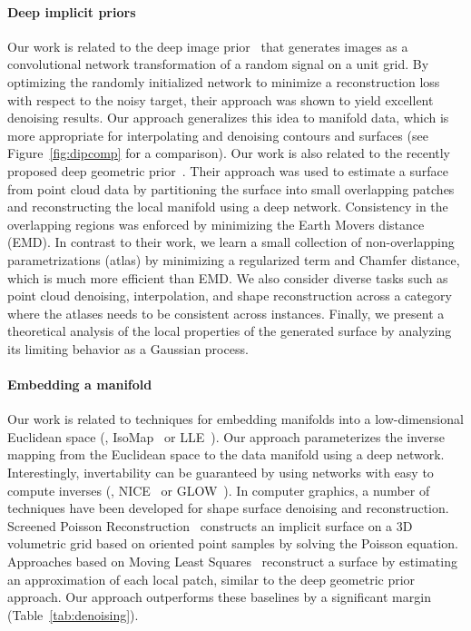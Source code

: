 \paragraph*{Deep implicit priors}
Our work is related to the deep
image prior~\cite{dip} that generates images as a
convolutional network transformation of a random signal on a unit
grid.
By optimizing the randomly initialized network to minimize a reconstruction loss with respect to the noisy target, their approach was shown to yield excellent denoising results.
Our approach generalizes this idea to manifold data, which is more appropriate for interpolating and denoising contours and surfaces  (see Figure~\ref{fig:dipcomp} for a comparison).
Our work is also related to the recently proposed deep geometric prior~\cite{williams2019deep}.
Their approach was used to estimate a surface from point cloud data by
partitioning the surface into small overlapping patches and reconstructing the local manifold
using a deep network.
Consistency in the overlapping regions was enforced by minimizing the Earth Movers distance (EMD). 
In contrast to their work, we learn a small collection of non-overlapping 
parametrizations (atlas) by minimizing a regularized term and Chamfer distance, which is much more efficient than EMD.
We also consider diverse tasks such as point cloud denoising, interpolation, and shape reconstruction across a category where the atlases needs to be consistent across instances. 
Finally, we present a theoretical analysis of the local properties of the
generated surface by analyzing its limiting behavior as a Gaussian
process.

\paragraph*{Embedding a manifold}
Our work is related to techniques for embedding manifolds into a low-dimensional
Euclidean space (\eg, IsoMap~\cite{isomap} or LLE~\cite{lle}).
Our approach parameterizes the inverse mapping
from the Euclidean space to the data manifold using a deep network.
Interestingly, invertability can be guaranteed by using networks with easy to compute inverses (\eg,
NICE~\cite{dinh2014nice} or GLOW~\cite{kingma2018glow}). 
In computer graphics, a number of techniques have been developed for shape surface denoising and
reconstruction.
Screened Poisson Reconstruction~\cite{spsr} constructs an implicit surface
on a 3D volumetric grid based on oriented point samples by solving the Poisson equation.
Approaches based on Moving Least Squares~\cite{mls,
  alexa2003computing, rimls} reconstruct a surface by 
estimating an approximation of each local patch, similar to the deep geometric prior~\cite{williams2019deep} approach.
Our approach outperforms these baselines by a significant margin (Table~\ref{tab:denoising}).

